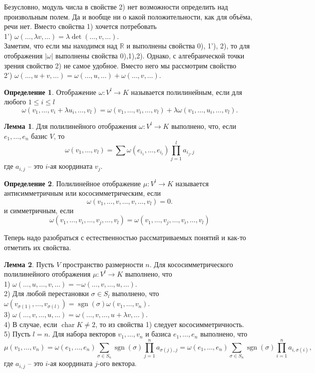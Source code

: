 \documentclass[10pt,a4paper,oneside]{book} %
\theoremstyle{definition}
\newtheorem*{defn}{Определение}
\newtheorem{lem}{Лемма}
\newcommand{\mb}[1]{\mathbb{#1}}
\newcommand{\chr}{\operatorname{char}}
\newcommand{\sgn}{\operatorname{sgn}}
\def\lm{\begin{lem}}
\def\elm{\end{lem}}
\begin{document}
Безусловно, модуль числа в свойстве 2) нет возможности определить над произвольным полем. Да и вообще ни о какой положительности, как для объёма, речи нет. Вместо свойства 1) хочется потребовать\\
1') $\omega(\dots,\lambda v,\dots)=\lambda \det(\dots,v,\dots)$.\\

Заметим, что если мы находимся над $\mb R$ и  выполнены свойства 0), 1'), 2), то для отображения $|\omega|$ выполнены свойства 0),1),2). Однако, с алгебраической точки зрения свойство 2) не самое удобное. Вместо него мы рассмотрим свойство\\
2') $\omega(\dots,u+v,\dots)=\omega(\dots,u,\dots)+\omega(\dots,v,\dots)$.


\begin{defn}
Отображение $\omega \colon  V^l\to K $ называется полилинейным, если для любого $1\leq i\leq l$ 
$$\omega(v_1,\dots,v_i+\lambda u_i,\dots, v_l)= \omega(v_1,\dots,v_i,\dots, v_l)+\lambda\omega(v_1,\dots,u_i,\dots, v_l).$$
\end{defn}

\lm Для полилинейного отображения $\omega \colon V^l \to K $ выполнено, что, если $e_1,\dots,e_n$ базис $V$, то 
$$\omega(v_1,\dots,v_l)=\sum \omega(e_{i_1},\dots,e_{i_l}) \prod_{j=1}^l a_{i_j,j}$$
где $a_{i,j}$ -- это $i$-ая координата $v_j$.\\
\elm

\begin{defn}
Полилинейное отображение $\mu \colon V^l\to K $ называется антисимметричным или кососимметрическим, если 
$$\omega(v_1,\dots,v,\dots,v,\dots, v_l)=0.$$ и симметричным, если
$$\omega(v_1,\dots,v_i,\dots,v_j,\dots, v_l)=\omega(v_1,\dots,v_j,\dots,v_i,\dots, v_l)$$
\end{defn}



Теперь надо разобраться с естественностью рассматриваемых понятий и как-то отметить их свойства.
\lm Пусть $V$ пространство размерности $n$. Для кососимметрического полилинейного отображения $\mu \colon V^l \to K $ выполнено, что \\
1) $\omega(\dots,u,\dots,v,\dots)= -\omega(\dots,v,\dots,u,\dots)$.\\
2) Для любой перестановки $\sigma \in S_l$ выполнено, что $\omega(v_{\sigma(1)},\dots,v_{\sigma(l)})= \sgn(\sigma) \omega(v_1,\dots,v_n)$.\\
3)  $\omega(\dots,v,\dots,u,\dots)=\omega(\dots,v,\dots,u+\lambda v,\dots)$.\\
4) В случае, если $\chr K \neq 2$, то из  свойства 1) следует кососимметричность.\\
5) Пусть $l=n$. Для набора векторов $v_1,\dots,v_n$ и базиса $e_1,\dots,e_n$ выполнено, что 
$$\mu(v_1,\dots,v_n)=\omega(e_1,\dots,e_n)\sum_{\sigma \in S_n} \sgn(\sigma)\prod_{j=1}^n a_{\sigma(j),j}=\omega(e_1,\dots,e_n)\sum_{\sigma \in S_n} \sgn(\sigma)\prod_{i=1}^n a_{i,\sigma(i)},$$
где $a_{i,j}$ -- это $i$-ая координата $j$-ого вектора.
\elm
\end{document}
